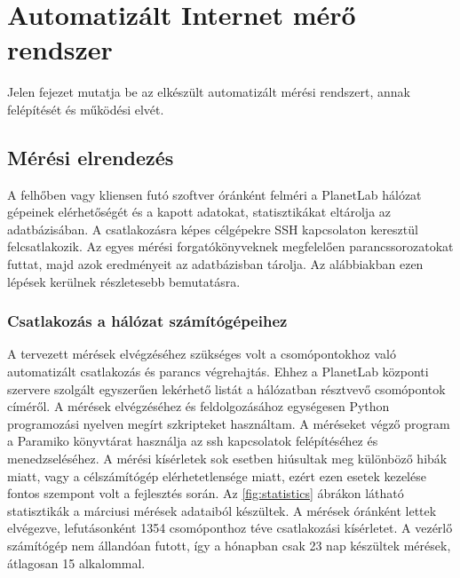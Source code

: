 \chapter{Automatizált Internet mérő rendszer}

Jelen fejezet mutatja be az elkészült automatizált mérési rendszert, annak felépítését és működési elvét.

\section{Mérési elrendezés}

A felhőben vagy kliensen futó szoftver óránként felméri a PlanetLab hálózat gépeinek elérhetőségét és a kapott adatokat, statisztikákat eltárolja az adatbázisában. A csatlakozásra képes célgépekre SSH kapcsolaton keresztül felcsatlakozik. Az egyes mérési forgatókönyveknek megfelelően parancssorozatokat futtat, majd azok eredményeit az adatbázisban tárolja.
Az alábbiakban ezen lépések kerülnek részletesebb bemutatásra.

\subsection{Csatlakozás a hálózat számítógépeihez}

A tervezett mérések elvégzéséhez szükséges volt a csomópontokhoz való automatizált csatlakozás és parancs végrehajtás. Ehhez a PlanetLab központi szervere szolgált egyszerűen lekérhető listát a hálózatban résztvevő csomópontok címéről. A mérések elvégzéséhez és feldolgozásához egységesen Python programozási nyelven megírt szkripteket használtam. A méréseket végző 
program a Paramiko\cite{paramiko} könyvtárat használja az ssh kapcsolatok felépítéséhez és menedzseléséhez. A mérési kísérletek sok esetben hiúsultak meg különböző hibák miatt, vagy a célszámítógép elérhetetlensége miatt, ezért ezen esetek kezelése fontos szempont volt a fejlesztés során. Az \ref{fig:statistics} ábrákon látható statisztikák a márciusi mérések adataiból készültek. A mérések óránként lettek elvégezve, lefutásonként 1354 csomóponthoz téve csatlakozási kísérletet. A vezérlő számítógép nem állandóan futott, így a hónapban csak 23 nap készültek mérések, átlagosan 15 alkalommal.

